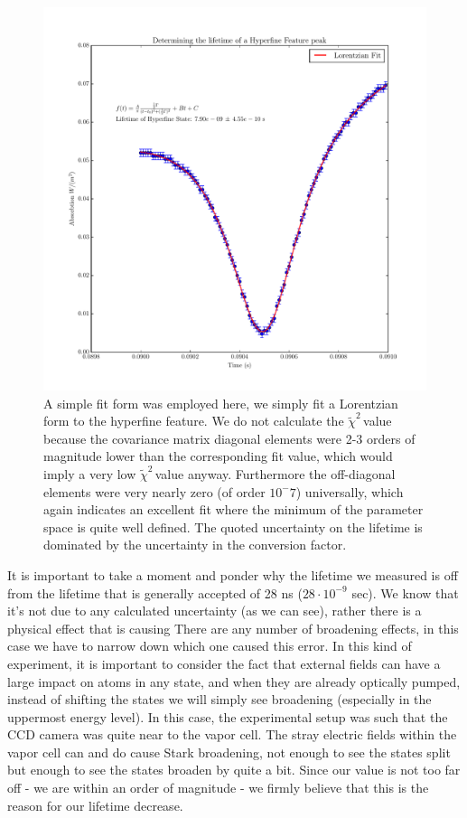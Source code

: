 \documentclass{article}
\newcommand{\redchi}{$\tilde{\chi}^2\,$}
\begin{document}
  \hspace{.25cm}

  \begin{figure}[!htb]
    \centering
    \includegraphics[scale=.75]{../plots/rb87_hyperfine.pdf}
    \caption{A simple fit form was employed here, we simply fit a Lorentzian form to the hyperfine feature.  We do not calculate the \redchi value because the covariance matrix diagonal elements were 2-3 orders of magnitude lower than the corresponding fit value, which would imply a very low \redchi value anyway.  Furthermore the off-diagonal elements were very nearly zero (of order $10^-7$) universally, which again indicates an excellent fit where the minimum of the parameter space is quite well defined.  The quoted uncertainty on the lifetime is dominated by the uncertainty in the conversion factor.}
    \label{lifetime}
  \end{figure}

  It is important to take a moment and ponder why the lifetime we measured is off from the lifetime that is generally accepted of 28 ns ($28\cdot10^{-9}$ sec).  We know that it's not due to any calculated uncertainty (as we can see), rather there is a physical effect that is causing   There are any number of broadening effects, in this case we have to narrow down which one caused this error.  In this kind of experiment, it is important to consider the fact that external fields can have a large impact on atoms in any state, and when they are already optically pumped, instead of shifting the states we will simply see broadening (especially in the uppermost energy level).  In this case, the experimental setup was such that the CCD camera was quite near to the vapor cell.  The stray electric fields within the vapor cell can and do cause Stark broadening, not enough to see the states split but enough to see the states broaden by quite a bit.  Since our value is not too far off - we are within an order of magnitude - we firmly believe that this is the reason for our lifetime decrease.
\end{document}
